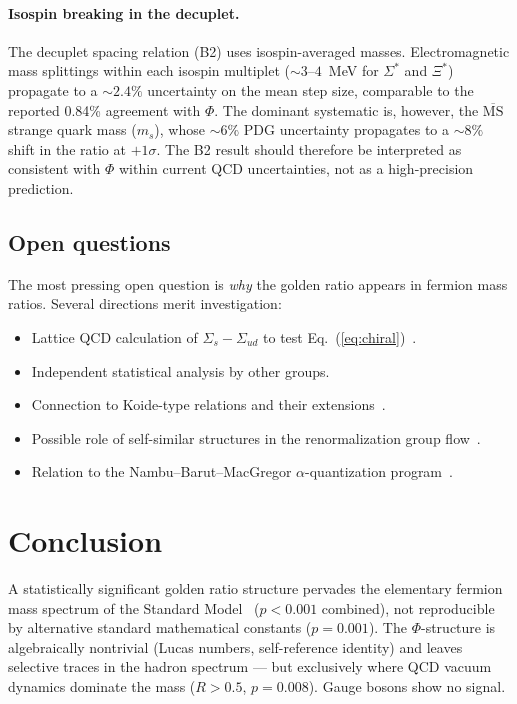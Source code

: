 \documentclass[11pt,a4paper]{article}
\begin{document}
\paragraph{Isospin breaking in the decuplet.}
The decuplet spacing relation (B2) uses isospin-averaged masses.
Electromagnetic mass splittings within each isospin multiplet
($\sim 3$--$4$~MeV for $\Sigma^*$ and $\Xi^*$) propagate to a
$\sim 2.4\%$ uncertainty on the mean step size, comparable to the
reported 0.84\% agreement with $\Phi$. The dominant systematic is,
however, the $\overline{\text{MS}}$ strange quark mass ($m_s$), whose
$\sim 6\%$ PDG uncertainty propagates to a $\sim 8\%$ shift in the
ratio at $+1\sigma$. The B2 result should therefore be interpreted
as consistent with $\Phi$ within current QCD uncertainties, not as a
high-precision prediction.

\subsection{Open questions}
\label{sec:open}

The most pressing open question is \emph{why} the golden ratio
appears in fermion mass ratios. Several directions merit
investigation:
\begin{itemize}
  \item Lattice QCD calculation of $\Sigma_s - \Sigma_{ud}$ to test
        Eq.~(\ref{eq:chiral})~\cite{Durr2008,Gupta2021}.
  \item Independent statistical analysis by other groups.
  \item Connection to Koide-type relations and their
        extensions~\cite{GaoLi2016,RiveroGsponer2005}.
  \item Possible role of self-similar structures in the renormalization
        group flow~\cite{Goldfain2011}.
  \item Relation to the Nambu--Barut--MacGregor $\alpha$-quantization
        program~\cite{Nambu1952,Barut1979,MacGregor2007}.
\end{itemize}

\section{Conclusion}
\label{sec:conclusion}

A statistically significant golden ratio structure pervades the
elementary fermion mass spectrum
of the Standard Model~\cite{PDG2024} ($p < 0.001$
combined), not reproducible by alternative standard mathematical
constants ($p = 0.001$).
The $\Phi$-structure is algebraically nontrivial (Lucas numbers,
self-reference identity) and leaves selective traces in the hadron
spectrum --- but exclusively where QCD vacuum dynamics dominate the
mass ($R > 0.5$, $p = 0.008$). Gauge bosons show no signal.
\end{document}
